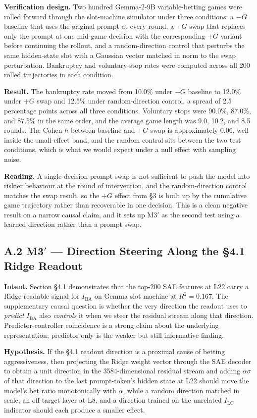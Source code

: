 \documentclass[11pt,a4paper]{article}
\begin{document}
\textbf{Verification design.} Two hundred Gemma-2-9B variable-betting games were rolled forward through the slot-machine simulator under three conditions: a $-G$ baseline that uses the original prompt at every round, a $+G$ swap that replaces only the prompt at one mid-game decision with the corresponding $+G$ variant before continuing the rollout, and a random-direction control that perturbs the same hidden-state slot with a Gaussian vector matched in norm to the swap perturbation. Bankruptcy and voluntary-stop rates were computed across all 200 rolled trajectories in each condition.

\textbf{Result.} The bankruptcy rate moved from 10.0\% under $-G$ baseline to 12.0\% under $+G$ swap and 12.5\% under random-direction control, a spread of 2.5 percentage points across all three conditions. Voluntary stops were 90.0\%, 87.0\%, and 87.5\% in the same order, and the average game length was 9.0, 10.2, and 8.5 rounds. The Cohen $h$ between baseline and $+G$ swap is approximately 0.06, well inside the small-effect band, and the random control sits between the two test conditions, which is what we would expect under a null effect with sampling noise.

\textbf{Reading.} A single-decision prompt swap is not sufficient to push the model into riskier behaviour at the round of intervention, and the random-direction control matches the swap result, so the $+G$ effect from \S3 is built up by the cumulative game trajectory rather than recoverable in one decision. This is a clean negative result on a narrow causal claim, and it sets up M3$'$ as the second test using a learned direction rather than a prompt swap.

\subsection*{A.2 M3$'$ --- Direction Steering Along the \S4.1 Ridge Readout}

\textbf{Intent.} Section \S4.1 demonstrates that the top-200 SAE features at L22 carry a Ridge-readable signal for $I_\text{BA}$ on Gemma slot machine at $R^2 = 0.167$. The supplementary causal question is whether the very direction the readout uses to \emph{predict} $I_\text{BA}$ also \emph{controls} it when we steer the residual stream along that direction. Predictor-controller coincidence is a strong claim about the underlying representation; predictor-only is the weaker but still informative finding.

\textbf{Hypothesis.} If the \S4.1 readout direction is a proximal cause of betting aggressiveness, then projecting the Ridge weight vector through the SAE decoder to obtain a unit direction in the 3584-dimensional residual stream and adding $\alpha \sigma$ of that direction to the last prompt-token's hidden state at L22 should move the model's bet ratio monotonically with $\alpha$, while a random direction matched in scale, an off-target layer at L8, and a direction trained on the unrelated $I_\text{LC}$ indicator should each produce a smaller effect.
\end{document}
